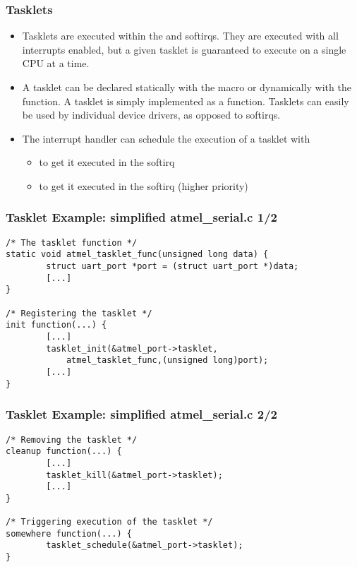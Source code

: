 \begin{frame}
  \frametitle{Tasklets}
  \begin{itemize}
  \item Tasklets are executed within the  and 
    softirqs. They are executed with all interrupts enabled, but a
    given tasklet is guaranteed to execute on a single CPU at a time.
  \item A tasklet can be declared statically with the
     macro or dynamically with the
     function. A tasklet is simply implemented as
    a function. Tasklets can easily be used by individual device
    drivers, as opposed to softirqs.
  \item The interrupt handler can schedule the execution of a tasklet
    with
    \begin{itemize}
    \item {} to get it executed in the
       softirq
    \item {} to get it executed in the
       softirq (higher priority)
    \end{itemize}
  \end{itemize}
\end{frame}

\begin{frame}[fragile]
  \frametitle{Tasklet Example: simplified atmel\_serial.c 1/2}
\begin{verbatim}
/* The tasklet function */
static void atmel_tasklet_func(unsigned long data) {
        struct uart_port *port = (struct uart_port *)data;
        [...]
}

/* Registering the tasklet */
init function(...) {
        [...]
        tasklet_init(&atmel_port->tasklet,
            atmel_tasklet_func,(unsigned long)port);
        [...]
}
\end{verbatim}
\end{frame}

\begin{frame}[fragile]
  \frametitle{Tasklet Example: simplified atmel\_serial.c 2/2}
\begin{verbatim}
/* Removing the tasklet */
cleanup function(...) {
        [...]
        tasklet_kill(&atmel_port->tasklet);
        [...]
}

/* Triggering execution of the tasklet */
somewhere function(...) {
        tasklet_schedule(&atmel_port->tasklet);
}
\end{verbatim}
\end{frame}

